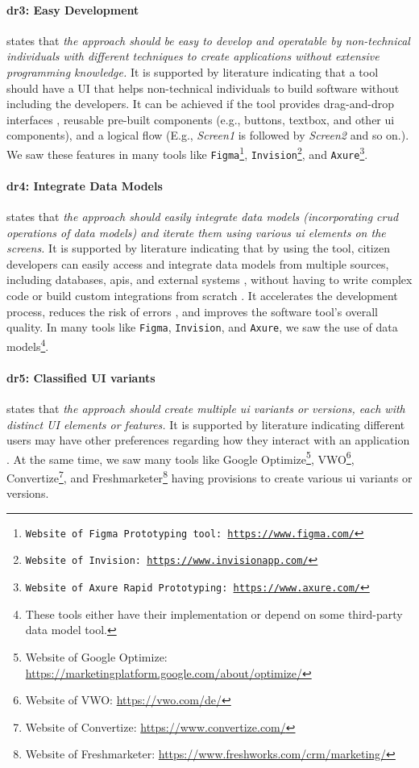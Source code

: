 \paragraph{\ac{dr}3: Easy Development} states that \textit{the approach should be easy to develop and operatable by non-technical individuals with different techniques to create applications without extensive programming knowledge.}
It is supported by literature indicating that a tool should have a UI that helps non-technical individuals to build software without including the developers. 
It can be achieved if the tool provides drag-and-drop interfaces \cite{article:nocode:miller}, reusable pre-built components \cite{article:prototyping:lowcode} (e.g., buttons, textbox, and other \ac{ui} components), and a logical flow (E.g., \textit{Screen1} is followed by \textit{Screen2} and so on.). 
We saw these features in many tools like \texttt{Figma\footnote{Website of Figma Prototyping tool: \url{https://www.figma.com/}}}, \texttt{Invision\footnote{Website of Invision: \url{https://www.invisionapp.com/}}}, and \texttt{Axure\footnote{Website of Axure Rapid Prototyping: \url{https://www.axure.com/}}}.

\paragraph{\ac{dr}4: Integrate Data Models} states that \textit{the approach should easily integrate data models (incorporating \ac{crud} operations of data models) and iterate them using various \ac{ui} elements on the screens.} 
It is supported by literature indicating that by using the tool, citizen developers can easily access and integrate data models from multiple sources, including databases, \ac{api}s, and external systems \cite{paper:lowcode:khorram}, without having to write complex code or build custom integrations from scratch \cite{article:lowcode:modeldriven}.
It accelerates the development process, reduces the risk of errors \cite{misc:lowcode:platforms}, and improves the software tool's overall quality.
In many tools like \texttt{Figma}, \texttt{Invision}, and \texttt{Axure}, we saw the use of data models\footnote{These tools either have their implementation or depend on some third-party data model tool.}.

\paragraph{\ac{dr}5: Classified UI variants} states that \textit{the approach should create multiple \ac{ui} variants or versions, each with distinct UI elements or features.}
It is supported by literature indicating different users may have other preferences regarding how they interact with an application \cite{article:swdemand:ahmed}.
At the same time, we saw many tools like Google Optimize\footnote{Website of Google Optimize: \url{https://marketingplatform.google.com/about/optimize/}}, VWO\footnote{Website of VWO: \url{https://vwo.com/de/}}, Convertize\footnote{Website of Convertize: \url{https://www.convertize.com/}}, and Freshmarketer\footnote{Website of Freshmarketer: \url{https://www.freshworks.com/crm/marketing/}} having provisions to create various \ac{ui} variants or versions.

